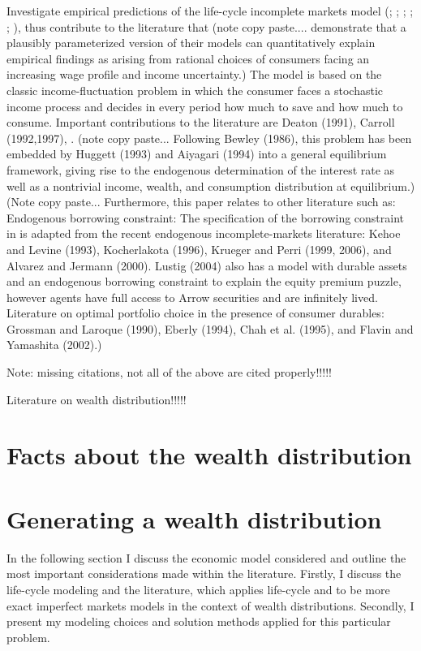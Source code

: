 \documentclass[a4paper,12pt]{article}
\begin{document}
Investigate empirical predictions of the life-cycle incomplete markets model (\cite{Gourinchas&Parker2002}; \cite{cagetti2003}; \cite{castaneda2003}; \cite{yang2009}; \cite{kaplan2010}; \cite{hintermaier2011}), thus contribute to the literature that (note copy paste.... demonstrate that a plausibly parameterized version of their models can quantitatively explain empirical findings as arising from rational choices of consumers facing an increasing wage profile and income uncertainty.)
The model is based on the classic income-fluctuation problem in which the consumer faces a stochastic income process and decides in every period how much to save and how much to consume. Important contributions to the literature are Deaton (1991), Carroll (1992,1997), \cite{Gourinchas&Parker2002}. (note copy paste... Following Bewley (1986), this problem has been embedded by Huggett (1993) and Aiyagari (1994) into a general equilibrium framework, giving rise to the endogenous determination of the interest rate as well as a nontrivial income, wealth, and consumption distribution at equilibrium.)
(Note copy paste... Furthermore, this paper relates to other literature such as: 
Endogenous borrowing constraint: The specification of the borrowing constraint  in \cite{FV&K2011} is adapted from the recent endogenous incomplete-markets literature: Kehoe and Levine (1993), Kocherlakota (1996), Krueger and Perri (1999, 2006), and Alvarez and Jermann (2000). Lustig (2004) also has a model with durable assets and an endogenous borrowing constraint to explain the equity premium puzzle, however agents have full access to Arrow securities and are infinitely lived.
Literature on optimal portfolio choice in the presence of consumer durables: Grossman and Laroque (1990), Eberly (1994), Chah et al. (1995), and Flavin and Yamashita (2002).)

Note: missing citations, not all of the above are cited properly!!!!!

Literature on wealth distribution!!!!! 

\section{Facts about the wealth distribution}

\section{Generating a wealth distribution}
\label{Chapter3}
In the following section I discuss the economic model considered and outline the most important considerations made within the literature. Firstly, I discuss the life-cycle modeling and the literature, which applies life-cycle and to be more exact imperfect markets models in the context of wealth distributions. Secondly, I present my modeling choices and solution methods applied for this particular problem. 
\end{document}
